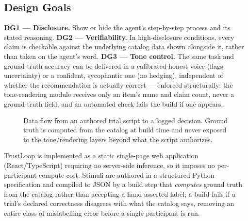 \documentclass[manuscript]{acmart}
\begin{document}
\subsection{Design Goals}
\textbf{DG1 --- Disclosure.} Show or hide the agent's step-by-step process and its stated reasoning.
\textbf{DG2 --- Verifiability.} In high-disclosure conditions, every claim is checkable against the underlying catalog data shown alongside it, rather than taken on the agent's word.
\textbf{DG3 --- Tone control.} The same task and ground-truth accuracy can be delivered in a calibrated-honest voice (flags uncertainty) or a confident, sycophantic one (no hedging), independent of whether the recommendation is actually correct --- enforced structurally: the tone-rendering module receives only an item's name and claim count, never a ground-truth field, and an automated check fails the build if one appears.

\begin{figure}[h]
\centering
{}
\caption{Data flow from an authored trial script to a logged decision. Ground truth is computed from the catalog at build time and never exposed to the tone/rendering layers beyond what the script authorizes.}
\label{fig:pipeline}
\end{figure}

TrustLoop is implemented as a static single-page web application (React/TypeScript) requiring no server-side inference, so it imposes no per-participant compute cost. Stimuli are authored in a structured Python specification and compiled to JSON by a build step that \emph{computes} ground truth from the catalog rather than accepting a hand-asserted label; a build fails if a trial's declared correctness disagrees with what the catalog says, removing an entire class of mislabelling error before a single participant is run.
\end{document}
